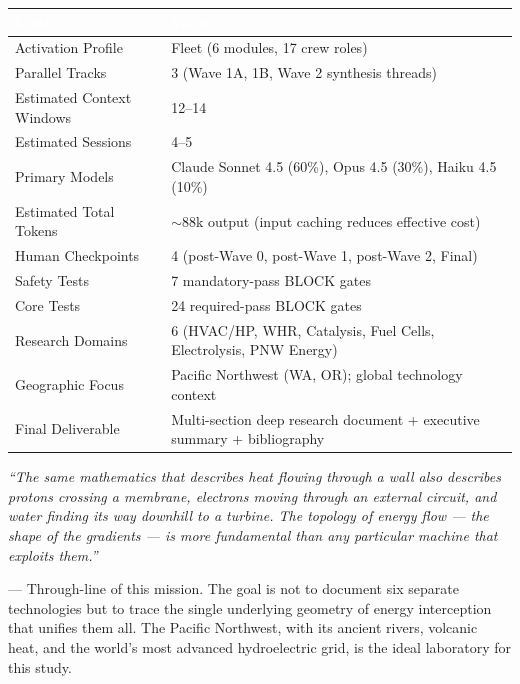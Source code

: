 \documentclass[11pt,letterpaper]{article}
\newcommand{\tableheader}[1]{\textbf{\sffamily\textcolor{white}{#1}}}
\begin{document}
\begin{center}
\begin{tabularx}{\textwidth}{L{5cm}X}
\toprule
{}
\tableheader{Metric} & \tableheader{Value} \\
\midrule
Activation Profile & Fleet (6 modules, 17 crew roles) \\
Parallel Tracks & 3 (Wave 1A, 1B, Wave 2 synthesis threads) \\
Estimated Context Windows & 12--14 \\
Estimated Sessions & 4--5 \\
Primary Models & Claude Sonnet 4.5 (60\%), Opus 4.5 (30\%), Haiku 4.5 (10\%) \\
Estimated Total Tokens & $\sim$88k output (input caching reduces effective cost) \\
Human Checkpoints & 4 (post-Wave 0, post-Wave 1, post-Wave 2, Final) \\
Safety Tests & 7 mandatory-pass BLOCK gates \\
Core Tests & 24 required-pass BLOCK gates \\
Research Domains & 6 (HVAC/HP, WHR, Catalysis, Fuel Cells, Electrolysis, PNW Energy) \\
Geographic Focus & Pacific Northwest (WA, OR); global technology context \\
Final Deliverable & Multi-section deep research document + executive summary + bibliography \\
\bottomrule
\end{tabularx}
\end{center}

\vspace{2em}

\begin{quotebox}
\textit{``The same mathematics that describes heat flowing through a wall also describes protons crossing a membrane, electrons moving through an external circuit, and water finding its way downhill to a turbine. The topology of energy flow — the shape of the gradients — is more fundamental than any particular machine that exploits them.''}

\vspace{0.8em}
\noindent — Through-line of this mission. The goal is not to document six separate technologies but to trace the single underlying geometry of energy interception that unifies them all. The Pacific Northwest, with its ancient rivers, volcanic heat, and the world's most advanced hydroelectric grid, is the ideal laboratory for this study.
\end{quotebox}
\end{document}
